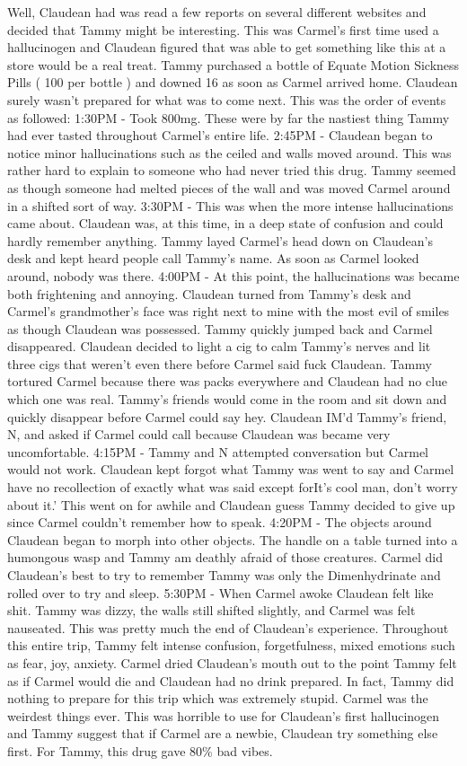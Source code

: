 \documentclass[12pt]{book}
\begin{document}
Well, Claudean had was read a few reports on several different websites and decided that Tammy might be interesting. This was Carmel's first time used a hallucinogen and Claudean figured that was able to get something like this at a store would be a real treat. Tammy purchased a bottle of Equate Motion Sickness Pills ( 100 per bottle ) and downed 16 as soon as Carmel arrived home. Claudean surely wasn't prepared for what was to come next. This was the order of events as followed: 1:30PM - Took 800mg. These were by far the nastiest thing Tammy had ever tasted throughout Carmel's entire life. 2:45PM - Claudean began to notice minor hallucinations such as the ceiled and walls moved around. This was rather hard to explain to someone who had never tried this drug. Tammy seemed as though someone had melted pieces of the wall and was moved Carmel around in a shifted sort of way. 3:30PM - This was when the more intense hallucinations came about. Claudean was, at this time, in a deep state of confusion and could hardly remember anything. Tammy layed Carmel's head down on Claudean's desk and kept heard people call Tammy's name. As soon as Carmel looked around, nobody was there. 4:00PM - At this point, the hallucinations was became both frightening and annoying. Claudean turned from Tammy's desk and Carmel's grandmother's face was right next to mine with the most evil of smiles as though Claudean was possessed. Tammy quickly jumped back and Carmel disappeared. Claudean decided to light a cig to calm Tammy's nerves and lit three cigs that weren't even there before Carmel said fuck Claudean. Tammy tortured Carmel because there was packs everywhere and Claudean had no clue which one was real. Tammy's friends would come in the room and sit down and quickly disappear before Carmel could say hey. Claudean IM'd Tammy's friend, N, and asked if Carmel could call because Claudean was became very uncomfortable. 4:15PM - Tammy and N attempted conversation but Carmel would not work. Claudean kept forgot what Tammy was went to say and Carmel have no recollection of exactly what was said except forIt's cool man, don't worry about it.' This went on for awhile and Claudean guess Tammy decided to give up since Carmel couldn't remember how to speak. 4:20PM - The objects around Claudean began to morph into other objects. The handle on a table turned into a humongous wasp and Tammy am deathly afraid of those creatures. Carmel did Claudean's best to try to remember Tammy was only the Dimenhydrinate and rolled over to try and sleep. 5:30PM - When Carmel awoke Claudean felt like shit. Tammy was dizzy, the walls still shifted slightly, and Carmel was felt nauseated. This was pretty much the end of Claudean's experience. Throughout this entire trip, Tammy felt intense confusion, forgetfulness, mixed emotions such as fear, joy, anxiety. Carmel dried Claudean's mouth out to the point Tammy felt as if Carmel would die and Claudean had no drink prepared. In fact, Tammy did nothing to prepare for this trip which was extremely stupid. Carmel was the weirdest things ever. This was horrible to use for Claudean's first hallucinogen and Tammy suggest that if Carmel are a newbie, Claudean try something else first. For Tammy, this drug gave 80\% bad vibes.
\end{document}
